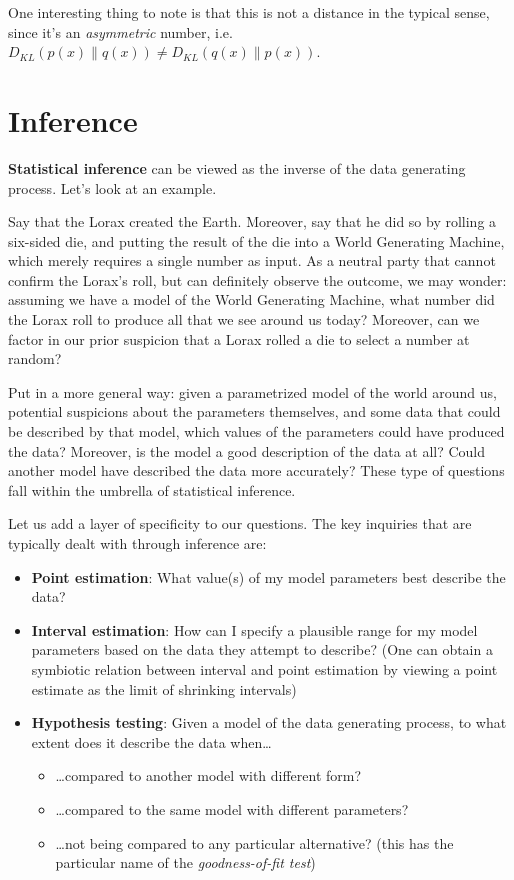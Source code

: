 \documentclass[
  11pt,
  numbers=noendperiod]{book}
\providecommand{\tightlist}{%
  \setlength{\itemsep}{0pt}\setlength{\parskip}{0pt}}\usepackage{longtable,booktabs,array}
\begin{document}
One interesting thing to note is that this is not a distance in the
typical sense, since it's an \emph{asymmetric} number,
i.e.~\(D_{KL}(p(x) \| q(x)) \neq D_{KL}(q(x) \| p(x))\).

\hypertarget{inference}{%
\section{Inference}\label{inference}}

\textbf{Statistical inference} can be viewed as the inverse of the data
generating process. Let's look at an example.

Say that the Lorax created the Earth. Moreover, say that he did so by
rolling a six-sided die, and putting the result of the die into a World
Generating Machine, which merely requires a single number as input. As a
neutral party that cannot confirm the Lorax's roll, but can definitely
observe the outcome, we may wonder: assuming we have a model of the
World Generating Machine, what number did the Lorax roll to produce all
that we see around us today? Moreover, can we factor in our prior
suspicion that a Lorax rolled a die to select a number at random?

Put in a more general way: given a parametrized model of the world
around us, potential suspicions about the parameters themselves, and
some data that could be described by that model, which values of the
parameters could have produced the data? Moreover, is the model a good
description of the data at all? Could another model have described the
data more accurately? These type of questions fall within the umbrella
of statistical inference.

Let us add a layer of specificity to our questions. The key inquiries
that are typically dealt with through inference are:

\begin{itemize}
\tightlist
\item
  \textbf{Point estimation}: What value(s) of my model parameters best
  describe the data?
\item
  \textbf{Interval estimation}: How can I specify a plausible range for
  my model parameters based on the data they attempt to describe? (One
  can obtain a symbiotic relation between interval and point estimation
  by viewing a point estimate as the limit of shrinking intervals)
\item
  \textbf{Hypothesis testing}: Given a model of the data generating
  process, to what extent does it describe the data when\ldots{}

  \begin{itemize}
  \tightlist
  \item
    \ldots compared to another model with different form?
  \item
    \ldots compared to the same model with different parameters?
  \item
    \ldots not being compared to any particular alternative? (this has
    the particular name of the \emph{goodness-of-fit test})
  \end{itemize}
\end{itemize}
\end{document}
